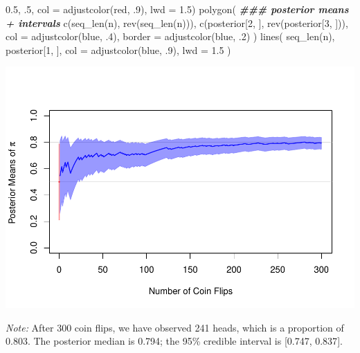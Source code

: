 \documentclass[
  11pt,
]{article}
\newenvironment{Shaded}{\begin{snugshade}}{\end{snugshade}}
\newcommand{\AttributeTok}[1]{\textcolor[rgb]{0.77,0.63,0.00}{#1}}
\newcommand{\DecValTok}[1]{\textcolor[rgb]{0.00,0.00,0.81}{#1}}
\newcommand{\DocumentationTok}[1]{\textcolor[rgb]{0.56,0.35,0.01}{\textbf{\textit{#1}}}}
\newcommand{\FloatTok}[1]{\textcolor[rgb]{0.00,0.00,0.81}{#1}}
\newcommand{\FunctionTok}[1]{\textcolor[rgb]{0.00,0.00,0.00}{#1}}
\newcommand{\NormalTok}[1]{#1}
\newcommand{\StringTok}[1]{\textcolor[rgb]{0.31,0.60,0.02}{#1}}
\begin{document}
\begin{Shaded}
\begin{Highlighting}[]
         \FloatTok{0.5}\NormalTok{, .}\DecValTok{5}\NormalTok{,}
         \AttributeTok{col =} \FunctionTok{adjustcolor}\NormalTok{(}\StringTok{\textquotesingle{}red\textquotesingle{}}\NormalTok{, .}\DecValTok{9}\NormalTok{),}
         \AttributeTok{lwd =} \FloatTok{1.5}\NormalTok{)}
\FunctionTok{polygon}\NormalTok{(                             }\DocumentationTok{\#\#\# posterior means + intervals}
  \FunctionTok{c}\NormalTok{(}\FunctionTok{seq\_len}\NormalTok{(n), }\FunctionTok{rev}\NormalTok{(}\FunctionTok{seq\_len}\NormalTok{(n))),}
  \FunctionTok{c}\NormalTok{(posterior[}\DecValTok{2}\NormalTok{, ], }\FunctionTok{rev}\NormalTok{(posterior[}\DecValTok{3}\NormalTok{, ])),}
  \AttributeTok{col =} \FunctionTok{adjustcolor}\NormalTok{(}\StringTok{\textquotesingle{}blue\textquotesingle{}}\NormalTok{, .}\DecValTok{4}\NormalTok{),}
  \AttributeTok{border =} \FunctionTok{adjustcolor}\NormalTok{(}\StringTok{\textquotesingle{}blue\textquotesingle{}}\NormalTok{, .}\DecValTok{2}\NormalTok{)}
\NormalTok{)}
\FunctionTok{lines}\NormalTok{(}
  \FunctionTok{seq\_len}\NormalTok{(n),}
\NormalTok{  posterior[}\DecValTok{1}\NormalTok{, ],}
  \AttributeTok{col =} \FunctionTok{adjustcolor}\NormalTok{(}\StringTok{\textquotesingle{}blue\textquotesingle{}}\NormalTok{, .}\DecValTok{9}\NormalTok{),}
  \AttributeTok{lwd =} \FloatTok{1.5}
\NormalTok{)}
\end{Highlighting}
\end{Shaded}

\begin{center}\includegraphics[width=0.75\linewidth]{03-lec_files/figure-latex/coin-sim2-1} \end{center}

\emph{Note:} After 300 coin flips, we have observed 241 heads, which is a proportion of 0.803. The posterior median is 0.794; the 95\% credible interval is {[}0.747, 0.837{]}.
\end{document}
